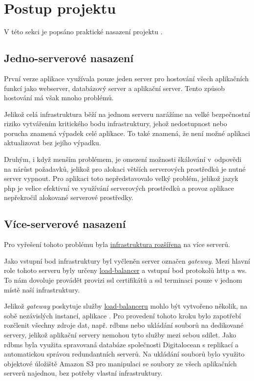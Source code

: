 \section{Postup projektu}

V této sekci je popsáno praktické nasazení projektu \bso{}.

\subsection{Jedno-serverové nasazení}\label{sub:one-server}

První verze aplikace \bso{} využívala pouze jeden server pro hostování všech aplikačních funkcí jako \acrshort{webserver}, databázový server a aplikační server. Tento způsob hostování má však mnoho problémů.

Jelikož celá infrastruktura běží na jednom serveru narážíme na velké bezpečnostní riziko vytvářením kritického bodu infrastruktury, jehož nedostupnost nebo porucha znamená výpadek celé aplikace. 
To také znamená, že není možné aplikaci aktualizovat bez jejího výpadku. 

Druhým, i když menším problémem, je omezení možnosti škálování v~odpovědi na nárůst požadavků, jelikož pro alokaci větších serverových prostředků je nutné server vypnout.
Pro aplikaci \bso{} toto nepředstavovalo velký problém, jelikož jazyk \acrshort{php} je velice efektivní ve využívání serverových prostředků a provoz aplikace nepřekročil alokované serverové prostředky.

\subsection{Více-serverové nasazení}\label{sub:multi-server}

Pro vyřešení tohoto problému byla \hyperref[fig:servery]{infrastruktura rozšířena} na více serverů. 

Jako vstupní bod infrastruktury byl vyčleněn server označen \textit{gateway}.
Mezi hlavní role tohoto serveru byly určeny \hyperref[sub:load-balancing]{load-balancer} a vstupní bod protokolů \acrshort{http} a \acrshort{ws}.
To nám dovoluje provádět provizi ssl certifikátů a ssl terminaci pouze v jednom místě naší infrastruktury.

Jelikož \textit{gateway} poskytuje služby \hyperref[sub:load-balancing]{load-balanceru} mohlo být vytvořeno několik, na sobě nezávislých instancí, aplikace \bso{}.
Pro provedení tohoto kroku bylo zapotřebí rozčlenit všechny zdroje dat, např. \acrshort{rdbms} nebo ukládání souborů na dedikované servery, jelikož aplikační servery nemohou tyto služby mezi sebou sdílet.
Jako \acrshort{rdbms} byla využita spravovaná databáze společnosti Digitalocean s replikací a automatickou správou redundantních serverů.
Na ukládání souborů bylo využito objektové úložiště Amazon S3 pro manipulaci se soubory ze všech aplikačních serverů najednou, bez potřeby vlastní infrastruktury.

